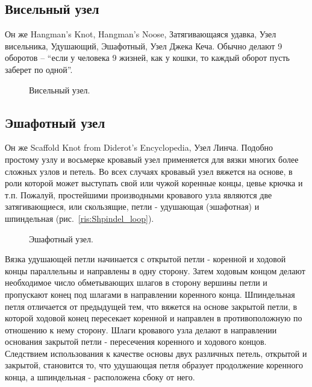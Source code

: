\subsection{Висельный узел}

Он же Hangman’s Knot, Hangman’s Noose, Затягивающаяся удавка, Узел висельника, Удушающий, Эшафотный, Узел Джека Кеча. Обычно делают 9 оборотов – \enquote{если у человека 9 жизней, как у кошки, то каждый оборот пусть заберет по одной}.


\begin{figure}[H]\centering
	\begin{minipage}{1\linewidth}
		\begin{center}
			\tcbox[enhanced jigsaw,colframe=black,opacityframe=0.5,opacityback=0.5]
			{\centering{}}
		\end{center}
	\end{minipage}
\caption{Висельный узел.}
\label{ris:Hangmans_Knot}
\end{figure}

\subsection{Эшафотный узел}

Он же Scaffold Knot from Diderot’s Encyclopedia, Узел Линча. Подобно простому узлу и восьмерке кровавый узел применяется для вязки многих более сложных узлов и петель. Во всех случаях кровавый узел вяжется на основе, в роли которой может выступать свой или чужой коренные концы, цевье крючка и т.п. Пожалуй, простейшими производными кровавого узла являются две затягивающиеся, или скользящие, петли - удушающая (эшафотная) и шпиндельная (рис.~\ref{ris:Shpindel_loop}).

\begin{figure}[H]\centering
	\begin{minipage}{1\linewidth}
		\begin{center}
			\tcbox[enhanced jigsaw,colframe=black,opacityframe=0.5,opacityback=0.5]
			{\centering{}}
		\end{center}
	\end{minipage}
\caption{Эшафотный узел.}
\label{ris:Scaffold_Knot}
\end{figure}

Вязка удушающей петли начинается с открытой петли - коренной и ходовой концы параллельны и направлены в одну сторону. Затем ходовым концом делают необходимое число обметывающих шлагов в сторону вершины петли и пропускают конец под шлагами в направлении коренного конца. Шпиндельная петля отличается от предыдущей тем, что вяжется на основе закрытой петли, в которой ходовой конец пересекает коренной и направлен в противоположную по отношению к нему сторону. Шлаги кровавого узла делают в направлении основания закрытой петли - пересечения коренного и ходового концов. Следствием использования к качестве основы двух различных петель, открытой и закрытой, становится то, что удушающая петля образует продолжение коренного конца, а шпиндельная - расположена сбоку от него.

